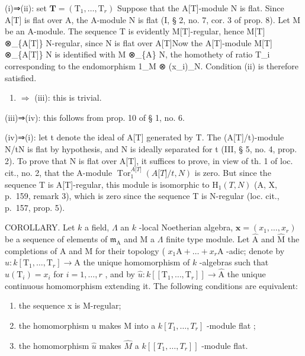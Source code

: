 (i)⇒(ii): set \(\mathbf{T} = (\mathrm{T}_{1}, \ldots, \mathrm{T}_{r})\) Suppose that the A{[}T{]}-module N is flat. Since A{[}T{]} is flat over A, the A-module N is flat (I, § 2, no. 7, cor. 3 of prop. 8). Let M be an A-module. The sequence T is evidently M{[}T{]}-regular, hence M{[}T{]} ⊗\_\{A{[}T{]}\} N-regular, since N is flat over A{[}T{]}Now the A{[}T{]}-module M{[}T{]} ⊗\_\{A{[}T{]}\} N is identified with M ⊗\_\{A\} N, the homothety of ratio T\_i corresponding to the endomorphism 1\_M ⊗ (x\_i)\_N. Condition (ii) is therefore satisfied.

\begin{enumerate}
\def\labelenumi{(\roman{enumi})}
\setcounter{enumi}{1}
\tightlist
\item
  \(\Rightarrow\) (iii): this is trivial.
\end{enumerate}

(iii)⇒(iv): this follows from prop. 10 of § 1, no. 6.

(iv)⇒(i): let t denote the ideal of A{[}T{]} generated by T. The (A{[}T{]}/t)-module N/tN is flat by hypothesis, and N is ideally separated for t (III, § 5, no. 4, prop. 2). To prove that N is flat over A{[}T{]}, it suffices to prove, in view of th. 1 of loc. cit., no. 2, that the A-module \(\operatorname{Tor}_{1}^{A{[}T{]}}(A{[}T{]}/t,N)\) is zero. But since the sequence T is A{[}T{]}-regular, this module is isomorphic to \(\mathrm{H}_{1}(T,N)\) (A, X, p.~159, remark 3), which is zero since the sequence T is N-regular (loc. cit., p.~157, prop. 5).

COROLLARY. Let \(k\) a field, \(\Lambda\) an \(k\) -local Noetherian algebra, \(\mathbf{x} = (x_1, \ldots, x_r)\) be a sequence of elements of \(\mathfrak{m}_{\mathrm{A}}\) and M a \(\Lambda\) finite type module. Let \(\widehat{\mathrm{A}}\) and \(\widehat{\mathrm{M}}\) the completions of A and M for their topology ( \(x_1\mathrm{A} + \ldots + x_r\mathrm{A}\) -adic; denote by \(u: k[\mathrm{T}_1, \ldots, \mathrm{T}_r] \longrightarrow \mathrm{A}\) the unique homomorphism of \(k\) -algebras such that \(u(\mathrm{T}_i) = x_i\) for \(i = 1, \ldots, r\) , and by \(\hat{u}: k[[\mathrm{T}_1, \ldots, \mathrm{T}_r]] \longrightarrow \widehat{\mathrm{A}}\) the unique continuous homomorphism extending it. The following conditions are equivalent:

\begin{enumerate}
\def\labelenumi{(\roman{enumi})}
\item
  the sequence x is M-regular;
\item
  the homomorphism u makes M into a \(k[T_{1},\ldots,T_{r}]\) -module flat ;
\item
  the homomorphism \(\hat{u}\) makes \(\hat{M}\) a \(k[[T_{1},\ldots,T_{r}]]\) -module flat.
\end{enumerate}

